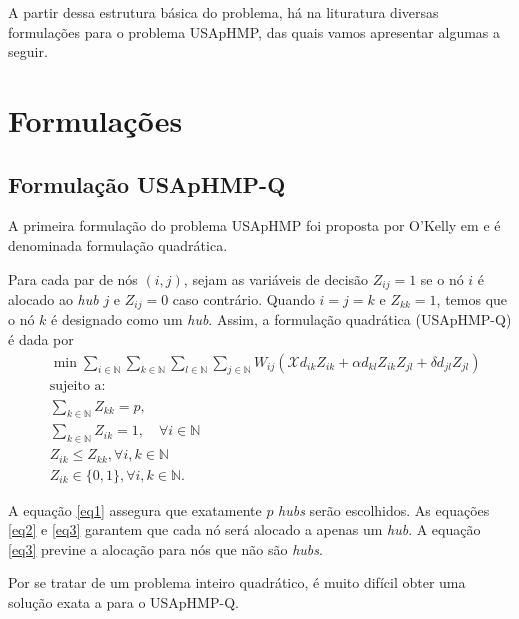 A partir dessa estrutura básica do problema, há na lituratura diversas formulações para o problema USApHMP, das quais vamos apresentar algumas a seguir.

\section{Formulações}
\subsection{Formulação USApHMP-Q}
A primeira formulação do problema USApHMP foi proposta por O'Kelly em \cite{OKelly1987} e é denominada formulação quadrática.

Para cada par de nós $(i, j)$, sejam as variáveis de decisão $Z_{ij}=1$ se o nó $i$ é alocado ao \textit{hub} $j$ e $Z_{ij} = 0$ caso contrário. Quando $i=j=k$ e $Z_{kk}=1$, temos que o nó $k$ é designado como um \textit{hub}. Assim, a formulação quadrática (USApHMP-Q) é dada por
\begin{align}
        &\min \sum_{i \in \mathbb{N}}\sum_{k \in \mathbb{N}}\sum_{l \in \mathbb{N}}\sum_{j \in \mathbb{N}}W_{ij}(\mathcal{X}d_{ik}Z_{ik}+\alpha d_{kl}Z_{ik}Z_{jl}+\delta d_{jl}Z_{jl}) \nonumber\\ & \text{sujeito a:} \nonumber\\ & \sum_{k \in \mathbb{N}}Z_{kk}=p, \label{eq1}\\ &\sum_{k \in \mathbb{N}}Z_{ik}=1, \label{eq2}\quad \forall i \in \mathbb{N} \\ & Z_{ik} \leq Z_{kk}, \forall i,k \in \mathbb{N} \label{eq3} \\ & Z_{ik} \in \{0,1\}, \forall i,k \in \mathbb{N}. \label{eq4}
\end{align}

A equação \ref{eq1} assegura que exatamente $p$ \textit{hubs} serão escolhidos. As equações \ref{eq2} e \ref{eq3} garantem que cada nó será alocado a apenas um \textit{hub}. A equação \ref{eq3} previne a alocação para nós que não são \textit{hubs}.

Por se tratar de um problema inteiro quadrático, é muito difícil obter uma solução exata a para o USApHMP-Q.

